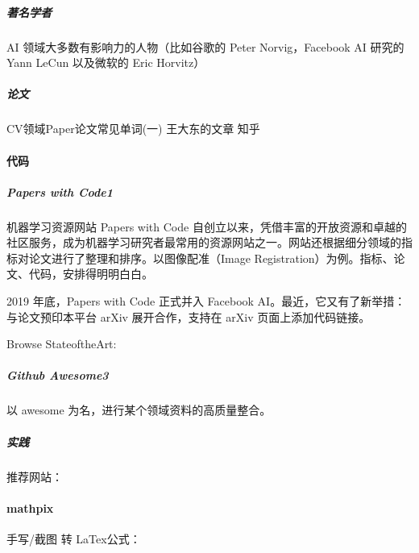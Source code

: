\documentclass[letterpaper,11pt,english]{sphinxmanual}
\begin{document}
\subparagraph{著名学者}
\label{\detokenize{chapter_knowledge/research:id6}}\label{\detokenize{chapter_knowledge/research:id7}}
AI 领域大多数有影响力的人物（比如谷歌的 Peter Norvig，Facebook AI 研究的
Yann LeCun 以及微软的 Eric Horvitz）


\subparagraph{论文}
\label{\detokenize{chapter_knowledge/research:id8}}

CV领域Paper论文常见单词(一) \sphinxhyphen{} 王大东的文章 \sphinxhyphen{} 知乎



\paragraph{代码}
\label{\detokenize{chapter_knowledge/research:id9}}

\subparagraph{Papers with Code1\sphinxfootnotemark[592]}
\label{\detokenize{chapter_knowledge/research:papers-with-code1}}%
\begin{footnotetext}[592]\sphinxAtStartFootnote
{}
%
\end{footnotetext}\ignorespaces 
机器学习资源网站 Papers with Code
自创立以来，凭借丰富的开放资源和卓越的社区服务，成为机器学习研究者最常用的资源网站之一。网站还根据细分领域的指标对论文进行了整理和排序。以图像配准（Image
Registration）为例。指标、论文、代码，安排得明明白白。

2019 年底，Papers with Code 正式并入 Facebook
AI。最近，它又有了新举措：与论文预印本平台 arXiv 展开合作，支持在 arXiv
页面上添加代码链接。

Browse State\sphinxhyphen{}of\sphinxhyphen{}the\sphinxhyphen{}Art: 


\subparagraph{Github \sphinxhyphen{} Awesome3}
\label{\detokenize{chapter_knowledge/research:github-awesome3}}
以 awesome 为名，进行某个领域资料的高质量整合。


\subparagraph{实践}
\label{\detokenize{chapter_knowledge/research:id10}}
推荐网站：


\paragraph{mathpix}
\label{\detokenize{chapter_knowledge/research:mathpix}}
手写/截图 转 LaTex公式：
\end{document}
